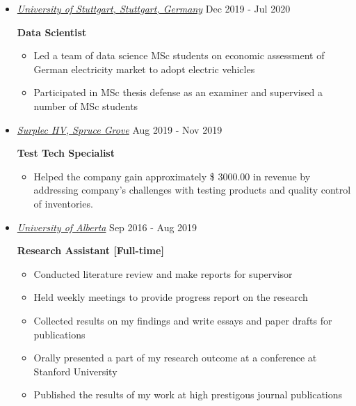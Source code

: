 \documentclass[10pt,a4paper,sans]{moderncv} %
\begin{document}
\begin{itemize}
	\item \href{https://www.iaas.uni-stuttgart.de/en}{ \emph{\large University of Stuttgart, Stuttgart, Germany}} \hfill Dec 2019 - Jul 2020
	\vspace{0.25cm}
	
	\textbf{\indent Data Scientist}
	\begin{itemize}
		\item Led a team of data science MSc students on economic assessment of German electricity market to adopt electric vehicles
		\item Participated in MSc thesis defense as an examiner and supervised a number of MSc students
	\end{itemize}
	\vspace{0.5cm}

	\item \href{https://www.surplec.com/en/}{\emph{\large Surplec HV, Spruce Grove}} \hfill Aug 2019 - Nov 2019
	
	\textbf{\indent Test Tech Specialist}
	\begin{itemize}
		\item Helped the company gain approximately \$ 3000.00 in revenue by addressing company's challenges with testing products and quality control of inventories.
	\end{itemize}

	\item \href{http://ualberta.ca/}{ \emph{\large University of Alberta}} \hfill Sep 2016 - Aug 2019
	
	\textbf{Research Assistant [Full-time]}
	\begin{itemize}
		\item Conducted literature review and make reports for supervisor
		\item Held weekly meetings to provide progress report on the research
		\item Collected results on my findings and write essays and paper drafts for publications
		\item Orally presented a part of my research outcome at a conference at Stanford University
		\item Published the results of my work at high prestigous journal publications
	\end{itemize}
	
	\end{itemize}
	

\end{document}
